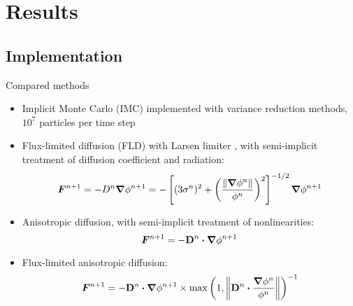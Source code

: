 \documentclass{beamer}
\begin{document}
\section{Results}
\subsection{Implementation}
\begin{frame}{Compared methods}
\begin{itemize}
  \item Implicit Monte Carlo (IMC) \cite{Fle1971} implemented with variance
    reduction methods, $10^7$ particles per time step
  \item {Fl}ux-limited diffusion (FLD) with Larsen limiter \cite{Ols2000}, with
    semi-implicit treatment of diffusion coefficient and radiation:
    \begin{equation*}
      \bm{F}^{n+1} = - D^{n} \bm{\nabla} \phi^{n+1}  = -\left[ (3\sigma^{n})^2
      + \left( \frac{\left\| \bm{\nabla} \phi^{n} \right\|}{\phi^{n}}  \right)^2 \right]^{-1/2}
      \bm{\nabla} \phi^{n+1}
    \end{equation*}
  \item Anisotropic diffusion, with semi-implicit treatment of nonlinearities:
    \begin{equation*}
      \bm{F}^{n+1} = -\mathbf{D}^{n}\bm{\cdot} \bm{\nabla} \phi^{n+1} 
    \end{equation*}
  \item Flux-limited anisotropic diffusion:
    \begin{equation*}
      \bm{F}^{n+1} = -\mathbf{D}^{n}\bm{\cdot} \bm{\nabla} \phi^{n+1} \times 
      \max\left( 1, \left\| \mathbf{D}^{n}\bm{\cdot} \frac{\bm{\nabla} \phi^{n}}{\phi^{n}} \right\|
      \right)^{-1}
    \end{equation*}
\end{itemize}
\end{frame}

\end{document}

